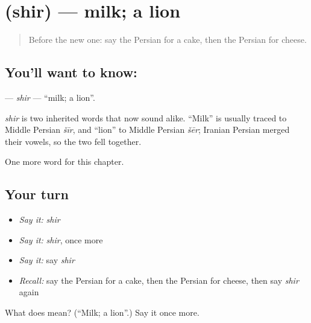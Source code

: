 \section[\texorpdfstring{\fa{شیر} (shir)}{شیر (shir)}]{ (shir) — milk; a lion}

\label{lesson:FA-C44-shir}



\begin{quote}
Before the new one: say the Persian for a cake, then the Persian for cheese.
\end{quote}

\subsection*{You'll want to know: }
\textbf{} — \emph{shir} — \textquotedblleft{}milk; a lion\textquotedblright{}.

\begin{cousinweb}
\emph{shir} is two inherited words that now sound alike. \textquotedblleft{}Milk\textquotedblright{} is usually traced to Middle Persian \emph{šīr}, and \textquotedblleft{}lion\textquotedblright{} to Middle Persian \emph{šēr}; Iranian Persian merged their vowels, so the two fell together.
\end{cousinweb}

\begin{grammarlens}[title={What you've built}]
One more word for this chapter.
\end{grammarlens}

\subsection*{Your turn}
\begin{itemize}
\raggedright
  \item \emph{Say it:} \emph{shir}
  \item \emph{Say it:} \emph{shir}, once more
  \item \emph{Say it:} say \emph{shir}
  \item \emph{Recall:} say the Persian for a cake, then the Persian for cheese, then say \emph{shir} again
\end{itemize}

\begin{tcolorbox}[breakable,colback=teal!4,colframe=teal!35!black,title={Before you move on}]
What does  mean? (\textquotedblleft{}Milk; a lion\textquotedblright{}.) Say it once more.
\end{tcolorbox}
